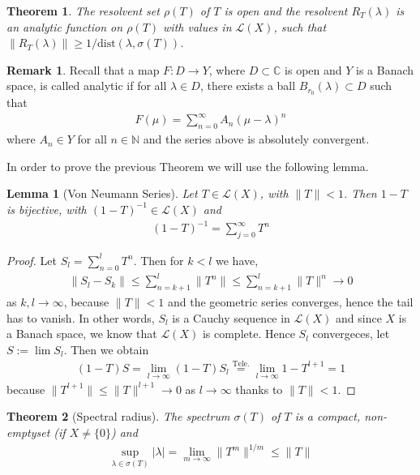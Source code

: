 \documentclass[11pt,a4paper]{article}
\newtheorem{lem}{Lemma}[section]
\newtheorem{thm}{Theorem}[section]
\theoremstyle{definition}
\newtheorem{rem}{Remark}[section]
\begin{document}
\begin{thm} The resolvent set $\rho(T)$ of $T$ is open and the resolvent $R_T( \lambda)$ is an analytic function on $\rho(T)$ with values in $\mathcal{L}(X)$, such that $\|R_T( \lambda)\| \geq 1/ \text{dist}( \lambda, \sigma(T))$. 
\end{thm}
\begin{rem} Recall that a map $F: D \to Y$, where $D \subset \mathbb{C}$ is open and $Y$ is a Banach space, is called analytic if for all $\lambda \in D$, there exists a ball $B_{r_0}( \lambda) \subset D$ such that 
\begin{align*}
F ( \mu) = \sum_{n=0}^\infty A_n( \mu- \lambda)^n
\end{align*}
where $A_n \in Y$ for all $n \in \mathbb{N}$ and the series above is absolutely convergent. 
\end{rem}
\newpage
In order to prove the previous Theorem we will use the following lemma. 
\begin{lem}[Von Neumann Series] Let $T \in \mathcal{L}(X)$, with $\| T \| < 1$. Then $1-T$ is bijective, with $(1-T)^{-1} \in \mathcal{L}(X)$ and 
\begin{align*}
(1-T)^{-1} = \sum_{j=0}^\infty T^n
\end{align*}
\end{lem}
\begin{proof}
Let $S_l = \sum_{n=0}^l T^n.$ Then for $k < l$ we have,
\begin{align*}
\|S_l-S_k\| \leq \sum_{n=k+1}^l \|T^n\| \leq \sum_{n=k+1}^l \|T\|^n \to 0
\end{align*}
as $k,l \to \infty$, because $\|T\|<1$ and the geometric series converges, hence the tail has to vanish. In other words, $S_l$ is a Cauchy sequence in $\mathcal{L}(X)$ and since $X$ is a Banach space, we know that $\mathcal{L}(X)$ is complete. Hence $S_l$ convergeces, let $S:= \lim S_l$. Then we obtain
\begin{align*}
(1-T)S= \lim_{l \to \infty} (1-T)S_l \overset{\text{Tele.}}= \lim_{l \to \infty} 1-T^{l+1}=1
\end{align*}
because $\|T^{l+1}\| \leq \|T\|^{l+1} \to 0$ as $l \to \infty$ thanks to $\|T\| < 1$. 
\end{proof}
\begin{thm}[Spectral radius] The spectrum $\sigma(T)$ of $T$ is a compact, non-emptyset (if $X \neq \lbrace 0 \rbrace$) and 
\begin{align*}
\sup_{ \lambda \in \sigma(T)} | \lambda| = \lim_{m \to \infty} \| T^m \|^{1/m} \leq \|T\|
\end{align*}
\end{thm}
\end{document}
